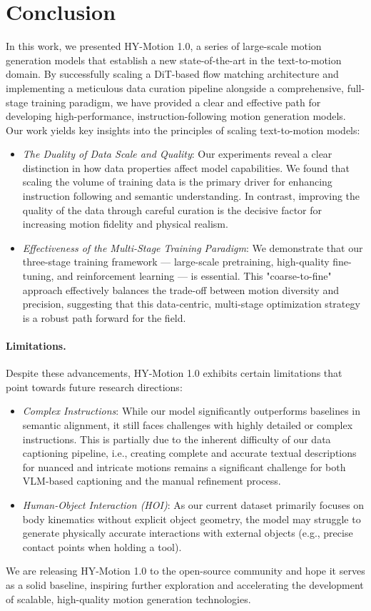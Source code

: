 \section{Conclusion}
\label{sec:conclusion}

In this work, we presented HY-Motion 1.0, a series of large-scale motion generation models that establish a new state-of-the-art in the text-to-motion domain. By successfully scaling a DiT-based flow matching architecture and implementing a meticulous data curation pipeline alongside a comprehensive, full-stage training paradigm, we have provided a clear and effective path for developing high-performance, instruction-following motion generation models. Our work yields key insights into the principles of scaling text-to-motion models:

\begin{itemize}
    \item \textit{The Duality of Data Scale and Quality}: Our experiments reveal a clear distinction in how data properties affect model capabilities. We found that scaling the volume of training data is the primary driver for enhancing instruction following and semantic understanding. In contrast, improving the quality of the data through careful curation is the decisive factor for increasing motion fidelity and physical realism.

    \item \textit{Effectiveness of the Multi-Stage Training Paradigm}: We demonstrate that our three-stage training framework — large-scale pretraining, high-quality fine-tuning, and reinforcement learning — is essential. This "coarse-to-fine" approach effectively balances the trade-off between motion diversity and precision, suggesting that this data-centric, multi-stage optimization strategy is a robust path forward for the field.
\end{itemize}

\paragraph{Limitations.}
Despite these advancements, HY-Motion 1.0 exhibits certain limitations that point towards future research directions:

\begin{itemize}
    \item \textit{Complex Instructions}: While our model significantly outperforms baselines in semantic alignment, it still faces challenges with highly detailed or complex instructions. This is partially due to the inherent difficulty of our data captioning pipeline, i.e., creating complete and accurate textual descriptions for nuanced and intricate motions remains a significant challenge for both VLM-based captioning and the manual refinement process. 
    
    \item \textit{Human-Object Interaction (HOI)}: As our current dataset primarily focuses on body kinematics without explicit object geometry, the model may struggle to generate physically accurate interactions with external objects (e.g., precise contact points when holding a tool).
\end{itemize}

We are releasing HY-Motion 1.0 to the open-source community and hope it serves as a solid baseline, inspiring further exploration and accelerating the development of scalable, high-quality motion generation technologies.


